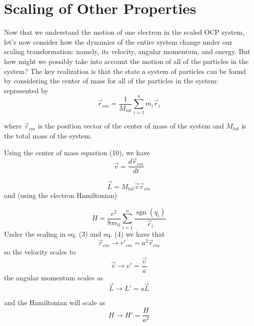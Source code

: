 \documentclass{article}
\newcommand{\sgn}{\mathop{\mathrm{sgn}}}
\begin{document}
\section{Scaling of Other Properties}
Now that we understand the motion of one electron in the scaled OCP system, let's now consider how the dynamics of the entire system change under our scaling transformation: namely, its velocity, angular momentum, and energy. But how might we possibly take into account the motion of all of the particles in the system? The key realization is that the state a system of particles can be found by considering the center of mass for all of the particles in the system: represented by
\begin{equation}
\vec{r}_{cm} = \frac{1}{M_{tot}} \sum_{i=1}^n m_i \vec{r}_i
\end{equation}

where $\vec{r}_{cm}$ is the position vector of the center of mass of the system and $M_{tot}$ is the total mass of the system.

Using the center of mass equation (10), we have
\begin{equation}
\vec{v} = \frac{d \vec{r}_{cm}}{dt}
\end{equation}


\begin{equation}
\vec{L} = M_{tot} \vec{v} \vec{r}_{cm}
\end{equation}
and (using the electron Hamiltonian)

\begin{equation}
H =\frac{e^2}{8 \pi \epsilon_0} \sum_{i=1}^n \frac{\sgn(q_{i})}{ \vec{r}_i}
\end{equation}
Under the scaling in eq. (3) and eq. (4) we have that
\begin{equation}
\vec{r}_{cm} \to r'_{cm} = a^2 \vec{r}_{cm}
\end{equation}
so the velocity scales to
\begin{equation}
\vec{v} \to v' = \frac{\vec{v}}{a}
\end{equation}
the angular momentum scales as
\begin{equation}
\vec{L} \to L' = a\vec{L}
\end{equation}

and the Hamiltonian will scale as
\begin{equation}
H \to H' = \frac{H}{a^2}
\end{equation}
\end{document}
